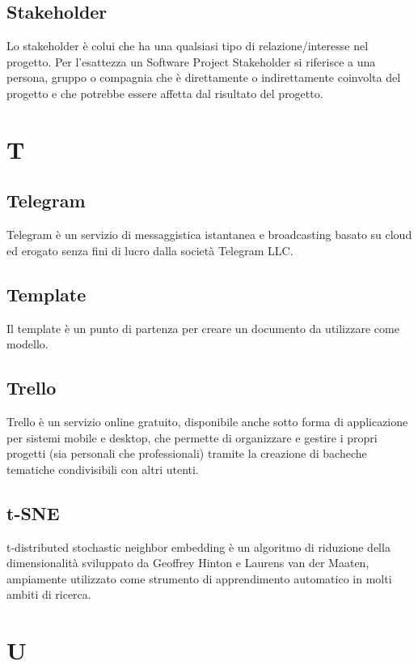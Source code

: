 \subsection{Stakeholder}
Lo stakeholder è colui che ha una qualsiasi tipo di relazione/interesse nel progetto. Per l'esattezza
un Software Project Stakeholder si riferisce a una persona, gruppo o compagnia che è direttamente o indirettamente coinvolta
del progetto e che potrebbe essere affetta dal risultato del progetto. 

\newpage
\section{T}
\subsection{Telegram}
Telegram è un servizio di messaggistica istantanea e broadcasting basato su cloud ed erogato senza fini di lucro dalla società Telegram LLC.

\subsection{Template}
Il template è un punto di partenza per creare un documento da utilizzare come modello.

\subsection{Trello}
Trello è un servizio online gratuito, disponibile anche sotto forma di applicazione per sistemi mobile e desktop, che permette di organizzare e gestire i propri progetti (sia personali che professionali) tramite la creazione di bacheche tematiche condivisibili con altri utenti.

\subsection{t-SNE}
t-distributed stochastic neighbor embedding è un algoritmo di riduzione della dimensionalità sviluppato da Geoffrey Hinton e Laurens van der Maaten, ampiamente utilizzato come strumento di apprendimento automatico in molti ambiti di ricerca.

\newpage
\section{U}
